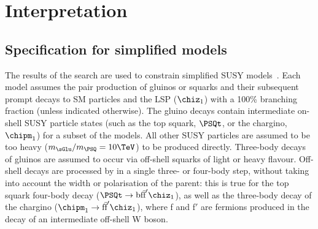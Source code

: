 \section{Interpretation} 
\label{sec:interpretations}

\subsection{Specification for simplified models} 

The results of the search are used to constrain simplified
SUSY models~\cite{Alwall:2008ag, Alwall:2008va, sms}. Each
model assumes the pair production of gluinos or squarks and their
subsequent prompt decays to SM particles and the LSP ($\chiz_1$) with
a 100\% branching fraction (unless indicated otherwise). The gluino
decays contain intermediate on-shell SUSY particle states (such as the top
squark, $\PSQt$, or the chargino, $\chipm_1$) for a subset of the
models. All other SUSY particles are assumed to be too heavy ($m_{\sGlu} /
m_{\PSQ} = 10\TeV$) to be produced directly. Three-body decays of
gluinos are assumed to occur via off-shell squarks of light or heavy
flavour. Off-shell decays are processed by \PYTHIA in a single three-
or four-body step, without taking into account the width or
polarisation of the parent: this is true for the top squark four-body
decay ($\PSQt \ra \text{bf}\bar{\text{f}}'\chiz_1$), as well as the
three-body decay of the chargino ($\chipm_1 \ra
\text{f}\bar{\text{f}}'\chiz_1$), where f and f$'$ are fermions
produced in the decay of an intermediate off-shell W boson. 

